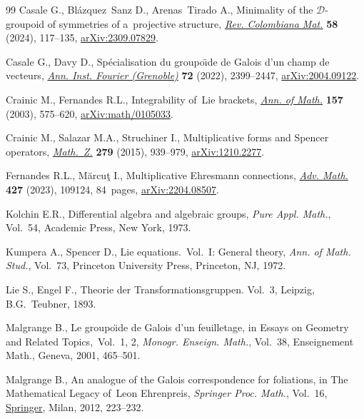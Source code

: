 \begin{thebibliography}{99}
Casale G., Bl\'azquez~Sanz D., Arenas~Tirado A., Minimality of the {$\mathcal
 D$}-groupoid of symmetries of a~projective structure,
 \href{https://doi.org/10.15446/recolma.v58n2.121031}{\textit{Rev. Colombiana
 Mat.}} \textbf{58} (2024), 117--135,
 \href{https://arxiv.org/abs/2309.07829}{arXiv:2309.07829}.

Casale G., Davy D., Sp\'ecialisation du groupo\"{\i}de de {G}alois d'un champ
 de vecteurs, \href{https://doi.org/10.5802/aif.3506}{\textit{Ann. Inst.
 Fourier (Grenoble)}} \textbf{72} (2022), 2399--2447,
 \href{https://arxiv.org/abs/2004.09122}{arXiv:2004.09122}.

Crainic M., Fernandes R.L., Integrability of~{L}ie brackets,
 \href{https://doi.org/10.4007/annals.2003.157.575}{\textit{Ann. of Math.}}
 \textbf{157} (2003), 575--620,
 \href{https://arxiv.org/abs/math/0105033}{arXiv:math/0105033}.

Crainic M., Salazar M.A., Struchiner I., Multiplicative forms and {S}pencer
 operators,
 \href{https://doi.org/10.1007/s00209-014-1398-z}{\textit{Math.~Z.}}
 \textbf{279} (2015), 939--979,
 \href{https://arxiv.org/abs/1210.2277}{arXiv:1210.2277}.

Fernandes R.L., M\u{a}rcu\c{t} I., Multiplicative {E}hresmann connections,
 \href{https://doi.org/10.1016/j.aim.2023.109124}{\textit{Adv. Math.}}
 \textbf{427} (2023), 109124, 84~pages,
 \href{https://arxiv.org/abs/2204.08507}{arXiv:2204.08507}.

Kolchin E.R., Differential algebra and algebraic groups, \textit{Pure Appl.
 Math.}, Vol.~54, Academic Press, New York, 1973.

Kumpera A., Spencer D., Lie equations.~{V}ol.~{I}: {G}eneral theory,
 \textit{Ann. of Math. Stud.}, Vol.~73, Princeton University Press, Princeton,
 NJ, 1972.

Lie S., Engel F., Theorie der {T}ransformationsgruppen. Vol.~3, Leipzig,
 B.G.~Teubner, 1893.

Malgrange B., Le groupo\"{\i}de de {G}alois d'un feuilletage, in Essays on
 {G}eometry and {R}elated {T}opics,~{V}ol.~1, 2, \textit{Monogr. Enseign.
 Math.}, Vol.~38, Enseignement Math., Geneva, 2001, 465--501.

Malgrange B., An analogue of the {G}alois correspondence for foliations, in The
 {M}athematical {L}egacy of~{L}eon {E}hrenpreis, \textit{Springer Proc.
 Math.}, Vol.~16,
 \href{https://doi.org/10.1007/978-88-470-1947-8_14}{Springer}, Milan, 2012,
 223--232.


\end{thebibliography}
